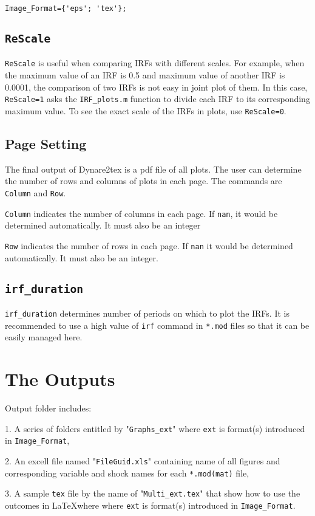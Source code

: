 \documentclass[11pt,a4paper]{article}
\begin{document}
\begin{lstlisting} 
Image_Format={'eps'; 'tex'};
\end{lstlisting}
    
\subsection{\texttt{ReScale}}
\texttt{ReScale} is useful when comparing IRFs with different scales. For example, when the maximum value of an IRF is 0.5 and maximum value of another IRF is 0.0001, the comparison of two IRFs is not easy in joint plot of them. In this case, \texttt{ReScale=1} asks the \texttt{IRF\_plots.m} function to divide each IRF to its corresponding maximum value. To see the exact scale of the IRFs in plots, use \texttt{ReScale=0}.
\subsection{Page Setting}
The final output of Dynare2tex is a pdf file of all plots. The user can determine the number of rows and columns of plots in each page. The commands are \texttt{Column} and \texttt{Row}.
 
\texttt{Column} indicates the number of columns in each page. If \texttt{nan}, it would be determined automatically. It must also be an integer

\texttt{Row} indicates the number of rows in each page. If \texttt{nan} it would be 
determined automatically. It must also be an integer.
\subsection{\texttt{irf_duration}}
\texttt{irf_duration} determines number of periods on which to plot the IRFs. It is recommended to use a high value of \texttt{irf} command in \texttt{*.mod} files so that it can be easily managed here.

\section{The Outputs}
Output folder includes:

1. A series of folders entitled by "\texttt{Graphs\_ext}" where \texttt{ext} is format(s) introduced in \texttt{Image_Format},

2. An excell file named "\texttt{FileGuid.xls}" containing name of all figures
and corresponding variable and shock names for each \texttt{*.mod(mat)} file,

3. A sample \texttt{tex} file by the name of "\texttt{Multi\_ext.tex}" that show how to use the outcomes in \LaTeX where where \texttt{ext} is format(s) introduced in \texttt{Image_Format}.
\end{document}
